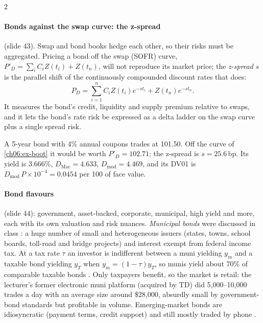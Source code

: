 \begin{paracol}{2}
\paragraph{Bonds against the swap curve: the z-spread} (slide 43). Swap and bond books hedge each other, so their
risks must be aggregated. Pricing a bond off the swap (SOFR) curve,
$P'_D=\sum_iC_iZ(t_i)+Z(t_n)$, will not reproduce its market price; the \emph{z-spread} $s$ is the parallel shift
of the continuously compounded discount rates that does:
\[
  P_D=\sum_{i=1}^{n}C_iZ(t_i)e^{-st_i}+Z(t_n)e^{-st_n}.
\]
It measures the bond's credit, liquidity and supply premium relative to swaps, and it lets the bond's rate risk be
expressed as a delta ladder on the swap curve plus a single spread risk.

\begin{example}
A 5-year bond with 4\% annual coupons trades at 101.50. Off the curve of \cref{ch06:ex-boot} it would be worth
$P'_D=102.71$; the z-spread is $s=25.6$\,bp. Its yield is 3.666\%, $D_{\mathrm{Mac}}=4.633$,
$D_{\mathrm{mod}}=4.469$, and its DV01 is $D_{\mathrm{mod}}\,P\times10^{-4}=0.0454$ per 100 of face value.
\end{example}

\paragraph{Bond flavours} (slide 44): government, asset-backed, corporate, municipal, high yield and more, each with
its own valuation and risk nuances. \emph{Municipal bonds} were discussed in class : a huge number
of small and heterogeneous issuers (states, towns, school boards, toll-road and bridge projects) and interest exempt
from federal income tax. At a tax rate $\tau$ an investor is indifferent between a muni yielding $y_m$ and a taxable
bond yielding $y_T$ when $y_m=(1-\tau)y_T$, so munis yield about 70\% of comparable taxable bonds
. Only taxpayers benefit, so the market is retail: the lecturer's former electronic muni platform
(acquired by TD) did 5{,}000--10{,}000 trades a day with an average size around \$28{,}000, absurdly small by
government-bond standards but profitable in volume. Emerging-market bonds are idiosyncratic (payment terms, credit
support) and still mostly traded by phone .


\end{paracol}
